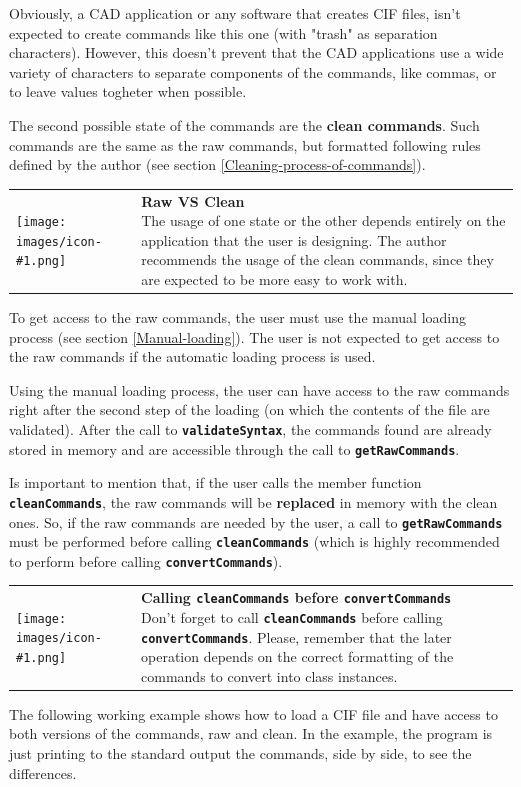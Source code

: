 \documentclass[11pt,twoside,openany,x11names,svgnames]{memoir}
\makeatletter
\newcommand{\IconNote}[3]
{
	\begin{table}[ht]
	\begin{tabular}{ lm{\dimexpr\textwidth-8\tabcolsep-\wd0}@{}}
		\toprule
		\texttt{[image: images/icon-\#1.png]}
		&
		\parbox[t]{155mm}{
		\textbf{#2} \\
		#3
		}
	\end{tabular}
\end{table}
}
\makeatother
\begin{document}
Obviously, a CAD application or any software that creates CIF files, isn't expected to create commands like this one (with "trash" as separation characters). However, this doesn't prevent that the CAD applications use a wide variety of characters to separate components of the commands, like commas, or to leave values togheter when possible.

The second possible state of the commands are the \textbf{clean commands}. Such commands are the same as the raw commands, but formatted following rules defined by the author (see section \ref{Cleaning-process-of-commands}).

\IconNote
	{info}
	{Raw VS Clean}
	{The usage of one state or the other depends entirely on the application that the user is designing. The author recommends the usage of the clean commands, since they are expected to be more easy to work with.}
	
To get access to the raw commands, the user must use the manual loading process (see section \ref{Manual-loading}). The user is not expected to get access to the raw commands if the automatic loading process is used.

Using the manual loading process, the user can have access to the raw commands right after the second step of the loading (on which the contents of the file are validated). After the call to \textbf{\texttt{validateSyntax}}, the commands found are already stored in memory and are accessible through the call to \textbf{\texttt{getRawCommands}}.

Is important to mention that, if the user calls the member function \textbf{\texttt{cleanCommands}}, the raw commands will be \textbf{replaced} in memory with the clean ones. So, if the raw commands are needed by the user, a call to \textbf{\texttt{getRawCommands}} must be performed before calling \textbf{\texttt{cleanCommands}} (which is highly recommended to perform before calling \textbf{\texttt{convertCommands}}).

\IconNote
	{warning}
	{Calling \textbf{\texttt{cleanCommands}} before \textbf{\texttt{convertCommands}}}
	{Don't forget to call \textbf{\texttt{cleanCommands}} before calling \textbf{\texttt{convertCommands}}. Please, remember that the later operation depends on the correct formatting of the commands to convert into class instances.}

The following working example shows how to load a CIF file and have access to both versions of the commands, raw and clean. In the example, the program is just printing to the standard output the commands, side by side, to see the differences.
\end{document}
